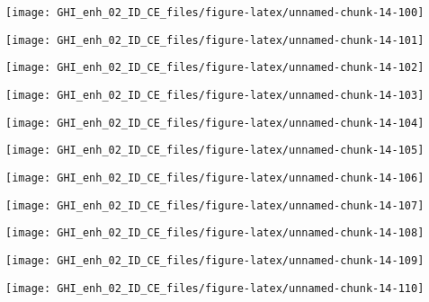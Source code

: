 \documentclass[
  10pt,
  a4paper,oneside]{article}
\begin{document}
\begin{center}\texttt{[image: GHI\_enh\_02\_ID\_CE\_files/figure-latex/unnamed-chunk-14-100]} \end{center}

\begin{center}\texttt{[image: GHI\_enh\_02\_ID\_CE\_files/figure-latex/unnamed-chunk-14-101]} \end{center}

\begin{center}\texttt{[image: GHI\_enh\_02\_ID\_CE\_files/figure-latex/unnamed-chunk-14-102]} \end{center}

\begin{center}\texttt{[image: GHI\_enh\_02\_ID\_CE\_files/figure-latex/unnamed-chunk-14-103]} \end{center}

\begin{center}\texttt{[image: GHI\_enh\_02\_ID\_CE\_files/figure-latex/unnamed-chunk-14-104]} \end{center}

\begin{center}\texttt{[image: GHI\_enh\_02\_ID\_CE\_files/figure-latex/unnamed-chunk-14-105]} \end{center}

\begin{center}\texttt{[image: GHI\_enh\_02\_ID\_CE\_files/figure-latex/unnamed-chunk-14-106]} \end{center}

\begin{center}\texttt{[image: GHI\_enh\_02\_ID\_CE\_files/figure-latex/unnamed-chunk-14-107]} \end{center}

\begin{center}\texttt{[image: GHI\_enh\_02\_ID\_CE\_files/figure-latex/unnamed-chunk-14-108]} \end{center}

\begin{center}\texttt{[image: GHI\_enh\_02\_ID\_CE\_files/figure-latex/unnamed-chunk-14-109]} \end{center}

\begin{center}\texttt{[image: GHI\_enh\_02\_ID\_CE\_files/figure-latex/unnamed-chunk-14-110]} \end{center}
\end{document}
